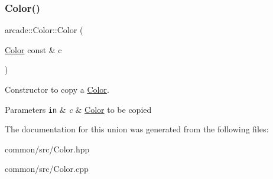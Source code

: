 \subsubsection{\texorpdfstring{Color()}{Color()}\hspace{0.1cm}{\footnotesize\ttfamily [3/3]}}
{\footnotesize\ttfamily arcade\+::\+Color\+::\+Color (\begin{DoxyParamCaption}\item[{\hyperlink{unionarcade_1_1Color}{Color} const \&}]{c }\end{DoxyParamCaption})}



Constructor to copy a \hyperlink{unionarcade_1_1Color}{Color}. 


\begin{DoxyParams}[1]{Parameters}
\mbox{\tt in}  & {\em c} & \hyperlink{unionarcade_1_1Color}{Color} to be copied \\
\hline
\end{DoxyParams}


The documentation for this union was generated from the following files\+:\begin{DoxyCompactItemize}
\item 
common/src/Color.\+hpp\item 
common/src/Color.\+cpp\end{DoxyCompactItemize}
